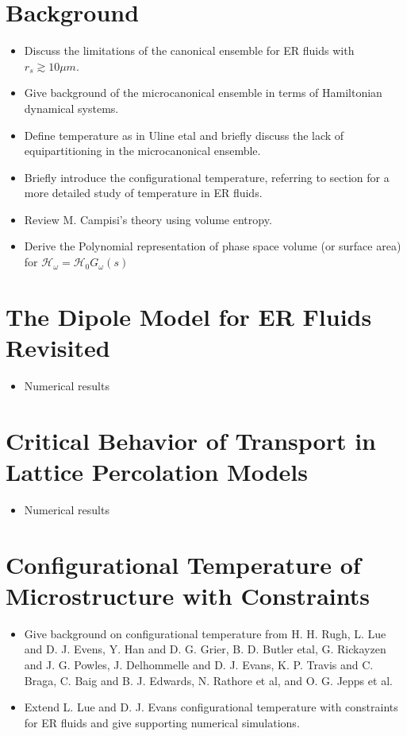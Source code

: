 \documentclass[english,12pt]{ttuthes}
\newcommand{\Hc}{\mathcal{H}}
\begin{document}
\section{Background}\label{sec:MicCanEns_Background}
%
\begin{itemize}
\item Discuss the limitations of the canonical ensemble for ER fluids
  with $r_s\gtrsim10\mu m$.  
\item Give background of the microcanonical ensemble in terms of
  Hamiltonian dynamical systems.  
\item Define temperature as in Uline etal \cite{Uline:JCP:124301} and
  briefly discuss the lack of equipartitioning in the microcanonical
  ensemble.
\item Briefly introduce the configurational temperature, referring to
  section %
  for a more detailed study of
  temperature in ER fluids.  
\item Review M. Campisi's theory using volume entropy.  
\item Derive the Polynomial representation of phase space volume (or
  surface area)  \cite{Uline:JCP:124301,Berdichevsky-1997} for
  $\Hc_\omega=\Hc_0G_\omega(s)$
\end{itemize}
%

\section{The Dipole Model for ER Fluids Revisited}
\begin{itemize}
\item Numerical results
\end{itemize}
%
\section{Critical Behavior of Transport in Lattice Percolation
  Models}
\begin{itemize}
\item Numerical results
\end{itemize}
%
\section{Configurational Temperature of Microstructure with Constraints}
\label{sec:MCE_Config_Temp}
\begin{itemize}
\item Give background on configurational temperature from H. H. Rugh,
  L. Lue and D. J. Evens, Y. Han and D. G. Grier, B. D. Butler etal,
  G. Rickayzen and J. G. Powles, J. Delhommelle and D. J. Evans,
  K. P. Travis and C. Braga, C. Baig and B. J. Edwards, N. Rathore et
  al, and O. G. Jepps et al.
\item Extend L. Lue and D. J. Evans configurational temperature with
  constraints for ER fluids and give supporting numerical simulations.    
\end{itemize}
%
\end{document}
